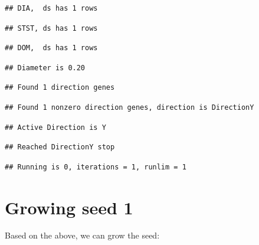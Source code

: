 \documentclass[]{article}
\begin{document}
\begin{verbatim}
## DIA,  ds has 1 rows
\end{verbatim}

\begin{verbatim}
## STST, ds has 1 rows
\end{verbatim}

\begin{verbatim}
## DOM,  ds has 1 rows
\end{verbatim}

\begin{verbatim}
## Diameter is 0.20
\end{verbatim}

\begin{verbatim}
## Found 1 direction genes
\end{verbatim}

\begin{verbatim}
## Found 1 nonzero direction genes, direction is DirectionY
\end{verbatim}

\begin{verbatim}
## Active Direction is Y
\end{verbatim}

\begin{verbatim}
## Reached DirectionY stop
\end{verbatim}

\begin{verbatim}
## Running is 0, iterations = 1, runlim = 1
\end{verbatim}

\hypertarget{growing-seed-1}{%
\section{Growing seed 1}\label{growing-seed-1}}

Based on the above, we can grow the seed:
\end{document}
